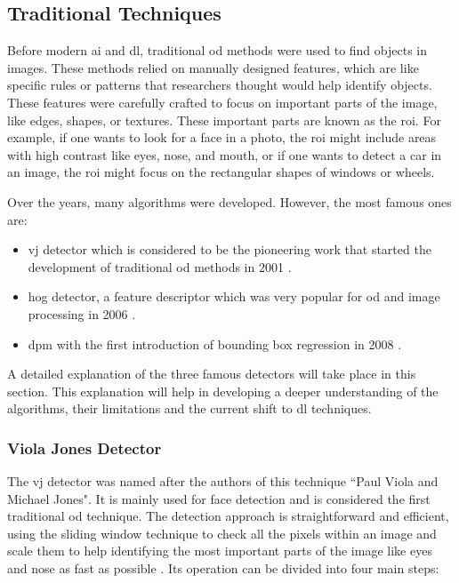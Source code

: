 \subsection{Traditional Techniques}
Before modern \gls{ai} and \gls{dl}, traditional \gls{od} methods were used to find objects in images. These methods relied on manually designed features, which are like specific rules or patterns that researchers thought would help identify objects. These features were carefully crafted to focus on important parts of the image, like edges, shapes, or textures. These important parts are known as the \gls{roi}. For example, if one wants to look for a face in a photo, the \gls{roi} might include areas with high contrast like eyes, nose, and mouth, or if one wants to detect a car in an image, the \gls{roi} might focus on the rectangular shapes of windows or wheels.

Over the years, many algorithms were developed. However, the most famous ones are:
\begin{itemize}
    \item \gls{vj} detector which is considered to be the pioneering work that started the development of traditional \gls{od} methods in 2001 \cite{Fam_Traditional_detectors}.
    \item \gls{hog} detector, a feature descriptor which was very popular for \gls{od} and image processing in 2006 \cite{Fam_Traditional_detectors}.
    \item \gls{dpm} with the first introduction of bounding box regression in 2008 \cite{Fam_Traditional_detectors}.
\end{itemize}

A detailed explanation of the three famous detectors will take place in this section. This explanation will help in developing a deeper understanding of the algorithms, their limitations and the current shift to \gls{dl} techniques.

\subsubsection{Viola Jones Detector}
The \gls{vj} detector was named after the authors of this technique “Paul Viola and Michael Jones". It is mainly used for face detection and is considered the first traditional \gls{od} technique. The detection approach is straightforward and efficient, using the sliding window technique to check all the pixels within an image and scale them to help identifying the most important parts of the image like eyes and nose as fast as possible \cite{oD_Review}. Its operation can be divided into four main steps:

